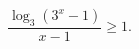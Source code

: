 \begin{ex}[type=inequality]
	\begin{condition}
		$\dfrac{\log_3(3^x - 1)}{x  - 1}\geqslant1  .$
	\end{condition}
\end{ex}